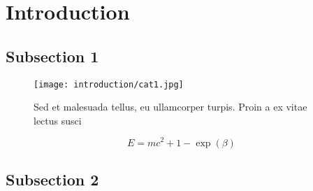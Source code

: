 \section{Introduction}
\lipsum[1]
\subsection{Subsection 1}
\lipsum [3-4]


\begin{figure}[t]
    \centering
    \texttt{[image: introduction/cat1.jpg]}
    \caption[This is a caption for the list of figures]{Sed et malesuada tellus, eu ullamcorper turpis. Proin a ex vitae lectus susci}
    \label{testfig}
\end{figure}
\lipsum[1]
\begin{equation}
    E = mc^2 + 1 - \exp(\beta)
\end{equation}

\subsection{Subsection 2}
\lipsum[5-8]